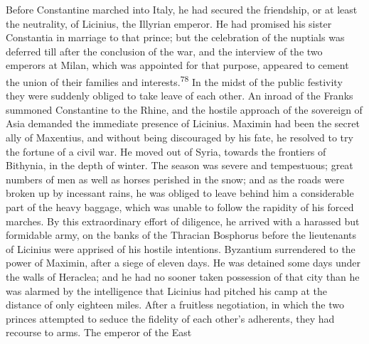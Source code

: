 

Before Constantine marched into Italy, he had secured the
friendship, or at least the neutrality, of Licinius, the Illyrian
emperor. He had promised his sister Constantia in marriage to
that prince; but the celebration of the nuptials was deferred
till after the conclusion of the war, and the interview of the
two emperors at Milan, which was appointed for that purpose,
appeared to cement the union of their families and interests.\textsuperscript{78}
In the midst of the public festivity they were suddenly obliged
to take leave of each other. An inroad of the Franks summoned
Constantine to the Rhine, and the hostile approach of the
sovereign of Asia demanded the immediate presence of Licinius.
Maximin had been the secret ally of Maxentius, and without being
discouraged by his fate, he resolved to try the fortune of a
civil war. He moved out of Syria, towards the frontiers of
Bithynia, in the depth of winter. The season was severe and
tempestuous; great numbers of men as well as horses perished in
the snow; and as the roads were broken up by incessant rains, he
was obliged to leave behind him a considerable part of the heavy
baggage, which was unable to follow the rapidity of his forced
marches. By this extraordinary effort of diligence, he arrived
with a harassed but formidable army, on the banks of the Thracian
Bosphorus before the lieutenants of Licinius were apprised of his
hostile intentions. Byzantium surrendered to the power of
Maximin, after a siege of eleven days. He was detained some days
under the walls of Heraclea; and he had no sooner taken
possession of that city than he was alarmed by the intelligence
that Licinius had pitched his camp at the distance of only
eighteen miles. After a fruitless negotiation, in which the two
princes attempted to seduce the fidelity of each other’s
adherents, they had recourse to arms. The emperor of the East
